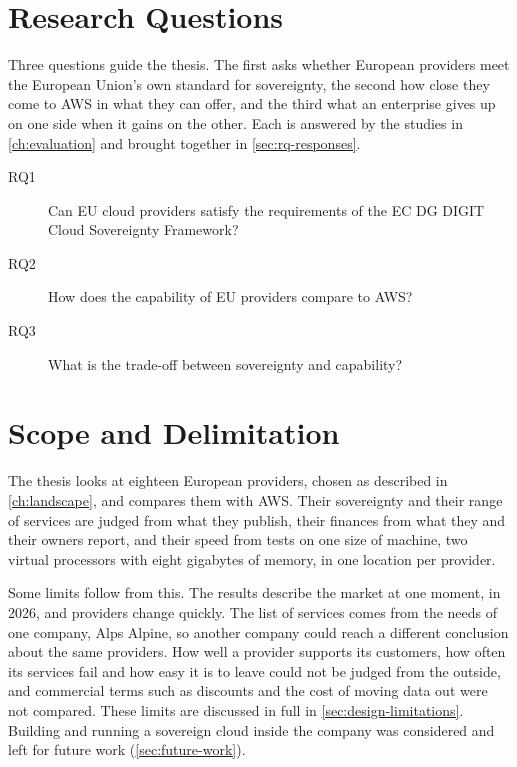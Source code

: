 \section{Research Questions}
\label{sec:research-questions}

Three questions guide the thesis. The first asks whether European providers meet the
European Union's own standard for sovereignty, the second how close they come to
\acs{AWS} in what they can offer, and the third what an enterprise gives up on one
side when it gains on the other. Each is answered by the studies in
\cref{ch:evaluation} and brought together in \cref{sec:rq-responses}.

\begin{description}
  \item[RQ1] Can EU cloud providers satisfy the requirements of the EC DG DIGIT
        Cloud Sovereignty Framework?
  \item[RQ2] How does the capability of EU providers compare to AWS?
  \item[RQ3] What is the trade-off between sovereignty and capability?
\end{description}

\section{Scope and Delimitation}
\label{sec:scope}

The thesis looks at eighteen European providers, chosen as described in
\cref{ch:landscape}, and compares them with \acs{AWS}. Their sovereignty and their
range of services are judged from what they publish, their finances from what they
and their owners report, and their speed from tests on one size of machine, two
virtual processors with eight gigabytes of memory, in one location per provider.

Some limits follow from this. The results describe the market at one moment, in 2026,
and providers change quickly. The list of services comes from the needs of one
company, Alps Alpine, so another company could reach a different conclusion about the
same providers. How well a provider supports its customers, how often its services
fail and how easy it is to leave could not be judged from the outside, and commercial
terms such as discounts and the cost of moving data out were not compared. These
limits are discussed in full in \cref{sec:design-limitations}. Building and running a
sovereign cloud inside the company was considered and left for future work
(\cref{sec:future-work}).


